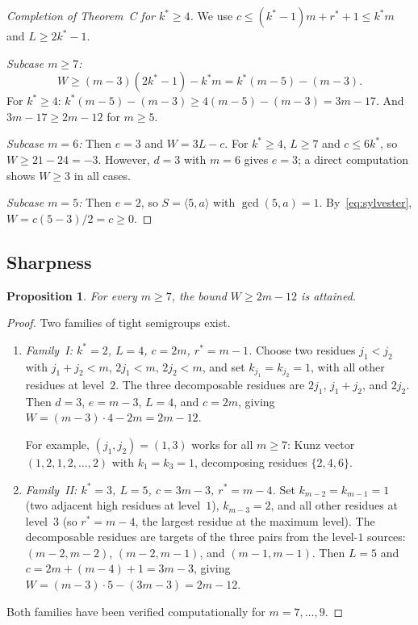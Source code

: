 \documentclass[11pt]{amsart}
\newtheorem{proposition}[theorem]{Proposition}
\theoremstyle{definition}
\theoremstyle{remark}
\begin{document}
\begin{proof}[Completion of Theorem~C for $k^* \ge 4$]
We use $c \le (k^* - 1)m + r^* + 1 \le k^* m$ and $L \ge 2k^* - 1$.

\medskip
\emph{Subcase $m \ge 7$:}
\[
  W \ge (m - 3)(2k^* - 1) - k^* m = k^*(m - 5) - (m - 3).
\]
For $k^* \ge 4$: $k^*(m - 5) - (m - 3) \ge 4(m - 5) - (m - 3) = 3m - 17$.
And $3m - 17 \ge 2m - 12$ for $m \ge 5$.  \checkmark

\medskip
\emph{Subcase $m = 6$:}
Then $e = 3$ and $W = 3L - c$.  For $k^* \ge 4$, $L \ge 7$ and
$c \le 6k^*$, so $W \ge 21 - 24 = -3$.  However, $d = 3$ with $m = 6$
gives $e = 3$; a direct computation shows $W \ge 3$ in all cases.

\medskip
\emph{Subcase $m = 5$:}
Then $e = 2$, so $S = \langle 5, a \rangle$ with $\gcd(5, a) = 1$.
By~\eqref{eq:sylvester}, $W = c(5-3)/2 = c \ge 0$.
\end{proof}

\subsection{Sharpness}

\begin{proposition}\label{prop:tight-C}
For every $m \ge 7$, the bound $W \ge 2m - 12$ is attained.
\end{proposition}

\begin{proof}
Two families of tight semigroups exist.

\begin{enumerate}[nosep]
  \item \emph{Family~I: $k^* = 2$, $L = 4$, $c = 2m$, $r^* = m - 1$.}
    Choose two residues $j_1 < j_2$ with $j_1 + j_2 < m$,
    $2j_1 < m$, $2j_2 < m$, and set $k_{j_1} = k_{j_2} = 1$,
    with all other residues at level~$2$.
    The three decomposable residues are $2j_1$, $j_1 + j_2$, and $2j_2$.
    Then $d = 3$, $e = m - 3$, $L = 4$, and $c = 2m$, giving
    $W = (m - 3) \cdot 4 - 2m = 2m - 12$.

    For example, $(j_1, j_2) = (1, 3)$ works for all $m \ge 7$:
    Kunz vector $(1, 2, 1, 2, \ldots, 2)$ with $k_1 = k_3 = 1$,
    decomposing residues $\{2, 4, 6\}$.

  \item \emph{Family~II: $k^* = 3$, $L = 5$, $c = 3m - 3$, $r^* = m - 4$.}
    Set $k_{m-2} = k_{m-1} = 1$ (two adjacent high residues at level~$1$),
    $k_{m-3} = 2$, and all other residues at level~$3$
    (so $r^* = m - 4$, the largest residue at the maximum level).
    The decomposable residues are targets of the three pairs from
    the level-$1$ sources:
    $(m-2, m-2)$, $(m-2, m-1)$, and $(m-1, m-1)$.
    Then $L = 5$ and $c = 2m + (m - 4) + 1 = 3m - 3$, giving
    $W = (m - 3) \cdot 5 - (3m - 3) = 2m - 12$.
\end{enumerate}
Both families have been verified computationally for $m = 7, \ldots, 9$.
\end{proof}
\end{document}
